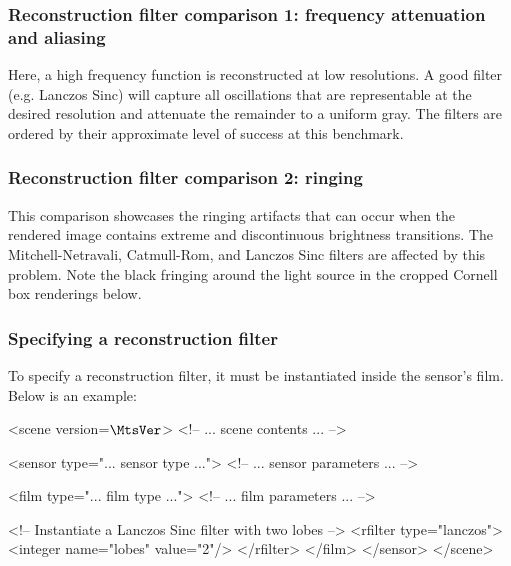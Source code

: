 \newpage
\subsubsection{Reconstruction filter comparison 1: frequency attenuation and aliasing}
\vspace{-2mm}
Here, a high frequency function is reconstructed at low resolutions. A good filter
(e.g. Lanczos Sinc) will capture all oscillations that are representable at the desired
resolution and attenuate the remainder to a uniform gray. The filters are ordered by their
approximate level of success at this benchmark.
\vspace{-4mm}
\vspace{-4mm}
\newpage
\subsubsection{Reconstruction filter comparison 2: ringing}
This comparison showcases the ringing artifacts that can occur when the rendered
image contains extreme and discontinuous brightness transitions. The
Mitchell-Netravali, Catmull-Rom, and Lanczos Sinc filters are affected by this problem.
Note the black fringing around the light source in the cropped Cornell box renderings below.
\vspace{-4mm}
\vspace{-4mm}
\subsubsection{Specifying a reconstruction filter}
To specify a reconstruction filter, it must be instantiated inside
the sensor's film. Below is an example:
\begin{xml}
<scene version=$\MtsVer$>
	<!-- ... scene contents ... -->

	<sensor type="... sensor type ...">
		<!-- ... sensor parameters ... -->

		<film type="... film type ...">
			<!-- ... film parameters ... -->

			<!-- Instantiate a Lanczos Sinc filter with two lobes -->
			<rfilter type="lanczos">
				<integer name="lobes" value="2"/>
			</rfilter>
		</film>
	</sensor>
</scene>
\end{xml}
